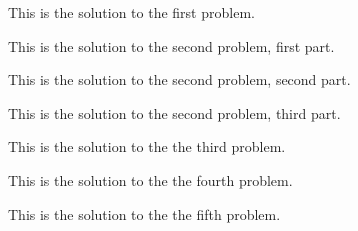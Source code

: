 \documentclass{cis320}
\begin{document}
\maketitle

\HWproblem
This is the solution to the first problem.

\HWproblem
\HWsubproblem
This is the solution to the second problem, first part.

\HWsubproblem
This is the solution to the second problem, second part.

\HWsubproblem
This is the solution to the second problem, third part.


\HWproblem
This is the solution to the the third problem.

\HWproblem
This is the solution to the the fourth problem.

\HWproblem
This is the solution to the the fifth problem.
\end{document}

